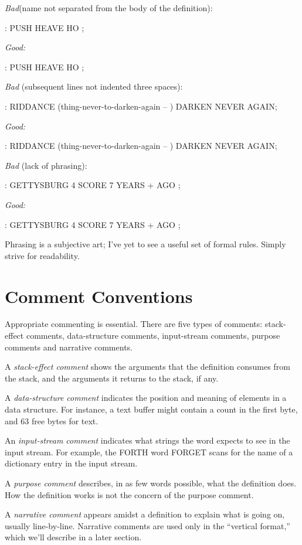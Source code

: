 \emph{Bad}(name not separated from the body of the definition):
\begin{Code}
: PUSH HEAVE HO ;
\end{Code}
\emph{Good:}
\begin{Code}
: PUSH   HEAVE HO ;
\end{Code}
\emph{Bad} (subsequent lines not indented three spaces):
\begin{Code}
: RIDDANCE (thing-never-to-darken-again -- )
DARKEN   NEVER AGAIN;
\end{Code}
\emph{Good:}
\begin{Code}
: RIDDANCE (thing-never-to-darken-again -- )
   DARKEN NEVER AGAIN;
\end{Code}
\emph{Bad} (lack of phrasing):
\begin{Code}
: GETTYSBURG   4 SCORE 7 YEARS + AGO ;
\end{Code}
\emph{Good:}
\begin{Code}
: GETTYSBURG   4 SCORE   7 YEARS +   AGO ;
\end{Code}
Phrasing is a subjective art; I've yet to see a useful set of formal rules.
Simply strive for readability.

\section{Comment Conventions}
Appropriate commenting is essential.  There are five types of comments:
stack-effect comments, data-structure comments, input-stream comments,
purpose comments and narrative comments.

A \emph{stack-effect comment} shows the arguments that the definition
consumes from the stack, and the arguments it returns to the stack, if
any.

A \emph{data-structure comment} indicates the position and meaning of elements
in a data structure.  For instance, a text buffer might contain a
count in the first byte, and 63 free bytes for text.

An \emph{input-stream comment} indicates what strings the word expects
to see in the input stream.  For example, the FORTH word FORGET
scans for the name of a dictionary entry in the input stream.

A \emph{purpose comment} describes, in as few words possible, what the
definition does.  How the definition works is not the concern of the purpose
comment.

A \emph{narrative comment} appears amidst a definition to explain what is
going on, usually line-by-line.  Narrative comments are used only in the
``vertical format,'' which we'll describe in a later section.

